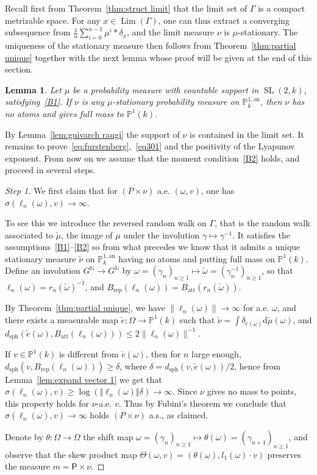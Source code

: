 \documentclass[11pt]{article}
\newtheorem{lemm}[theo]{Lemma}
\theoremstyle{definition}
\numberwithin{equation}{section}
\numberwithin{figure}{section}
\numberwithin{table}{section}
\DeclareMathOperator{\Lm}{Lim}
\DeclareMathOperator{\sph}{sph}
\DeclareMathOperator{\SL}{SL}
\newcommand{\nn}{\mathbb{N}}
\newcommand{\pp}{\mathbb{P}}
\newcommand{\prob}{\mathsf{P}}
\newcommand{\cv}{\rightarrow}
\newcommand{\norm}[1]{\left\Vert#1\right\Vert}
\newcommand{\PP}{\mathbb{P}}
\newcommand{\berk}{{\mathbb{P}^{1, \mathrm{an}}_k}}
\newcommand{\att}{\mathrm{att}}
\newcommand{\rep}{\mathrm{rep}}
\newcommand{\SLk}{\SL(2,k)}
\newcommand*{\dd}{\mathrm{d}}
\newenvironment{step}{\begin{proof}}{\let\qed\relax \end{proof}}
\begin{document}
Recall first from Theorem~\ref{thm:struct limit} that the limit set of $\Gamma$ is a compact metrizable space. For any $x\in \Lm(\Gamma)$, one can thus extract a converging subsequence from $\frac1{n} \sum_{i=0}^{n-1}\mu^ i \ast \delta_{x}$, and the limit measure $\nu$ is $\mu$-stationary. The uniqueness of the stationary measure then follows from Theorem~\ref{thm:partial unique} together with the next lemma whose proof will be given at the end of this section.

\begin{lemm}\label{lem:Hk}
Let $\mu$ be a probability measure with countable support in $\SLk$, satisfying~\eqref{B1}. If $\nu$ is any $\mu$-stationary probability measure on $\berk$, then $\nu$ has no atoms and gives full mass to $ \PP^1(k)$.
\end{lemm}

By Lemma~\ref{lem:guivarch raugi} the support of $\nu$ is contained in the limit set. It remains to prove~\eqref{eq:furstenberg},~\eqref{eq301} and the positivity of the Lyapunov exponent. From now on we assume that the moment condition~\eqref{B2} holds, and proceed in several steps.

\begin{step}[Step 1]
We first claim that for $(P\times \nu)$ a.e. $(\omega,v)$, one has $\sigma(\ell_n(\omega), v)\cv\infty$.

To see this we introduce the reversed random walk on $\Gamma$, that is the random walk associated to $\check \mu$, the image of $\mu$ under the involution $\gamma\mapsto \gamma^{-1}$. It satisfies the assumptions~\eqref{B1}--\eqref{B2} so from what precedes we know that it admits a unique stationary measure $\check\nu$ on $\berk$ having no atoms and putting full mass on $\PP^1(k)$. Define an involution $G^\nn\to G^\nn$ by $\omega = (\gamma_n)_{n\geq 1 }\mapsto \check \omega = (\gamma_n^{-1})_{n\geq 1}$, so that $\ell_n(\omega) = r_n(\check \omega)^{-1}$, and $B_{\rep}(\ell_n(\omega)) = B_{\att}(r_n(\check \omega))$.

By Theorem~\ref{thm:partial unique}, we have $\| \ell_n(\omega)\| \to \infty$ for a.e. $\omega$, and there exists a measurable map $\check{e}: \Omega \to \PP^1(k)$ such that $\check \nu = \int \delta_{\check e(\omega)} \dd\check\mu(\omega)$, and $d_{\sph}(\check e(\omega), B_\att(\ell_n(\omega))) \le 2\| \ell_n(\omega)\|^{-1}$.

If $v\in \pp^1(k)$ is different from $\check e(\omega)$, then for $n$ large enough, $d_{\mathrm{sph}}(v, B_{\rep}(\ell_n(\omega)))\geq \delta$, where $\delta = d_{\mathrm{sph}}(v, \check e(\omega))/2$, hence from Lemma~\ref{lem:expand vector 1} we get that $\sigma(\ell_n(\omega), v)\geq \log (\norm {\ell_n(\omega)}\delta)\to \infty$. Since $\nu$ gives no mass to points, this property holds for $\nu$-a.e. $v$. Thus by Fubini's theorem we conclude that $\sigma(\ell_n(\omega), v)\cv\infty$ holds $(P\times \nu)$ a.s., as claimed.

Denote by $\theta : \Omega \to \Omega$ the shift map $\omega = (\gamma_n)_{n\ge 1} \mapsto \theta(\omega) = (\gamma_{n+1})_{n\ge 1}$, and observe that the skew product map $\Theta(\omega,v) = (\theta(\omega), l_1(\omega) \cdot v)$ preserves the measure $m = \prob\times \nu$.
\end{step}
\end{document}
